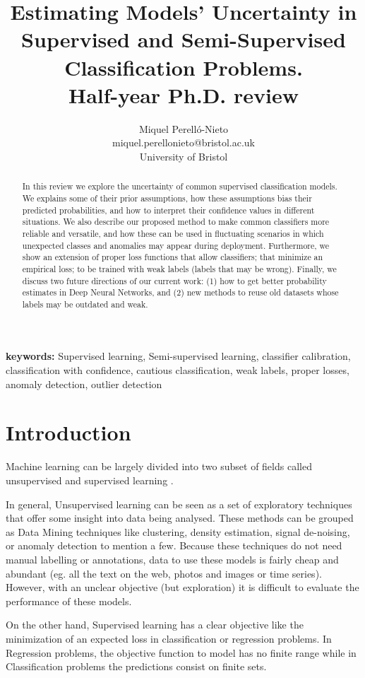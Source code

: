 \documentclass[a4paper, 12pt]{article}
\title{Estimating Models' Uncertainty in Supervised and Semi-Supervised Classification Problems. \\ Half-year Ph.D. review}
\author{Miquel Perelló-Nieto \\
miquel.perellonieto@bristol.ac.uk \\
University of Bristol}
\begin{document}
\maketitle

\begin{abstract}
In this review we explore the uncertainty of common supervised classification models.
We explains some of their prior assumptions, how these assumptions bias their predicted probabilities, and how to interpret their confidence values in different situations.
We also describe our proposed method to make common classifiers more reliable and versatile, and how these can be used in fluctuating scenarios in which unexpected classes and anomalies may appear during deployment.
Furthermore, we show an extension of proper loss functions that allow classifiers; that minimize an empirical loss; to be trained with weak labels (labels that may be wrong).
Finally, we discuss two future directions of our current work: (1) how to get better probability estimates in Deep Neural Networks, and (2) new methods to reuse old datasets whose labels may be outdated and weak.
\end{abstract}
\textbf{keywords:} Supervised learning, Semi-supervised learning, classifier calibration, classification with confidence, cautious classification, weak labels, proper losses, anomaly detection, outlier detection

\section{Introduction}

Machine learning can be largely divided into two subset of fields called unsupervised and supervised learning \cite{Bishop2006}.

In general, Unsupervised learning can be seen as a set of exploratory techniques that offer some insight into data being analysed.
These methods can be grouped as Data Mining techniques like clustering, density estimation, signal de-noising, or anomaly detection to mention a few.
Because these techniques do not need manual labelling or annotations, data to use these models is fairly cheap and abundant (eg. all the text on the web,  photos and images or time series).
However, with an unclear objective (but exploration) it is difficult to evaluate the performance of these models.

On the other hand, Supervised learning has a clear objective like the minimization of an expected loss in classification or regression problems.
In Regression problems, the objective function to model has no finite range while in Classification problems the predictions consist on finite sets.
\end{document}
